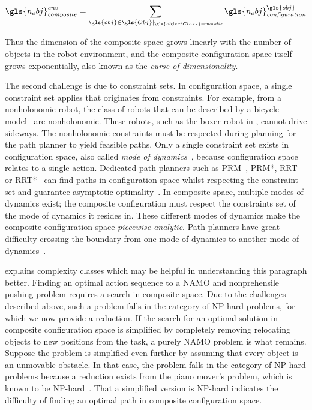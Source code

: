 \[ \gls{n_obj}_\mathit{composite}^\mathit{env} = \sum_{\gls{obj} \in \gls{Obj} |_{\gls{objectClass} = \mathit{movable}}} \gls{n_obj}^{\gls{obj}}_\mathit{configuration} \]

Thus the dimension of the composite space grows linearly with the number of objects in the robot environment, and the composite configuration space itself grows exponentially, also known as the \textit{curse of dimensionality}.\bs

The second challenge is due to constraint sets. In configuration space, a single constraint set applies that originates from constraints. For example, from a nonholonomic robot, the class of robots that can be described by a bicycle model~\cite{polack_kinematic_2017} are nonholonomic. These robots, such as the boxer robot in , cannot drive sideways. The nonholonomic constraints must be respected during planning for the path planner to yield feasible paths. Only a single constraint set exists in configuration space, also called \textit{mode of dynamics}~\cite{hauser_multimodal_2010}, because configuration space relates to a single action. Dedicated path planners such as \acs{PRM}~\cite{hsu_path_1997}, \acs{PRM*}, \acs{RRT} or \acs{RRT*}~\cite{karaman_samplingbased_2011} can find paths in configuration space whilst respecting the constraint set and guarantee asymptotic optimality~\cite{karaman_samplingbased_2011}. In composite space, multiple modes of dynamics exist; the composite configuration must respect the constraints set of the mode of dynamics it resides in. These different modes of dynamics make the composite configuration space \textit{piecewise-analytic}. Path planners have great difficulty crossing the boundary from one mode of dynamics to another mode of dynamics~\cite{vega-brown_asymptotically_2020}.\bs

 explains complexity classes which may be helpful in understanding this paragraph better. Finding an optimal action sequence to a \ac{NAMO} and nonprehensile pushing problem requires a search in composite space. Due to the challenges described above, such a problem falls in the category of \ac{NP-hard} problems, for which we now provide a reduction. If the search for an optimal solution in composite configuration space is simplified by completely removing relocating objects to new positions from the task, a purely \ac{NAMO} problem is what remains. Suppose the problem is simplified even further by assuming that every object is an unmovable obstacle. In that case, the problem falls in the category of \ac{NP-hard} problems because a reduction exists from the piano mover's problem, which is known to be \ac{NP-hard}~\cite{reif_motion_1985}. That a simplified version is \ac{NP-hard} indicates the difficulty of finding an optimal path in composite configuration space.\bs

